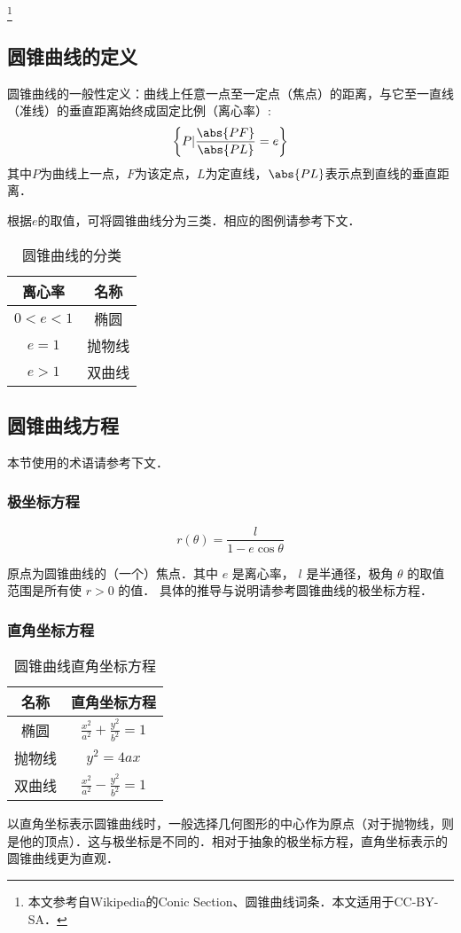 
\begin{issues}
\issueDraft
\end{issues}

\footnote{本文参考自Wikipedia的Conic Section、圆锥曲线词条．本文适用于CC-BY-SA．}

\subsection{圆锥曲线的定义}
圆锥曲线的一般性定义：曲线上任意一点至一定点（焦点）的距离，与它至一直线（准线）的垂直距离始终成固定比例（离心率）:
\begin{equation}
\left \{P \vert \frac{\abs{PF}}{\abs{PL}}=e \right \}
\end{equation}
其中$P$为曲线上一点，$F$为该定点，$L$为定直线，$\abs{PL}$表示点到直线的垂直距离．

根据$e$的取值，可将圆锥曲线分为三类．相应的图例请参考下文．
\begin{table}[ht]
\centering
\caption{圆锥曲线的分类}\label{conic_tab2}
\begin{tabular}{|c|c|}
\hline
离心率 & 名称\\
\hline
$0<e<1$ & 椭圆\\
\hline
$e=1$ & 抛物线\\
\hline
$e>1$ & 双曲线\\
\hline
\end{tabular}
\end{table}

\subsection{圆锥曲线方程}
本节使用的术语请参考下文．
\subsubsection{极坐标方程}
\begin{equation}
r(\theta)  = \frac{l}{1 - e\cos \theta }
\end{equation}

原点为圆锥曲线的（一个）焦点．其中 $e$ 是离心率， $l$ 是半通径，极角 $\theta$ 的取值范围是所有使 $r>0$ 的值． 
具体的推导与说明请参考圆锥曲线的极坐标方程．
\subsubsection{直角坐标方程}
\begin{table}[ht]
\centering
\caption{圆锥曲线直角坐标方程}\label{conic_tab3}
\begin{tabular}{|c|c|}
\hline
名称 & 直角坐标方程 \\
\hline
椭圆 & $\frac{x^2}{a^2} + \frac{y^2}{b^2} = 1$ \\
\hline
抛物线 & $y^2=4ax$ \\
\hline
双曲线 & $\frac{x^2}{a^2} - \frac{y^2}{b^2} = 1$ \\
\hline
\end{tabular}
\end{table}
以直角坐标表示圆锥曲线时，一般选择几何图形的中心作为原点（对于抛物线，则是他的顶点）．这与极坐标是不同的．相对于抽象的极坐标方程，直角坐标表示的圆锥曲线更为直观．

